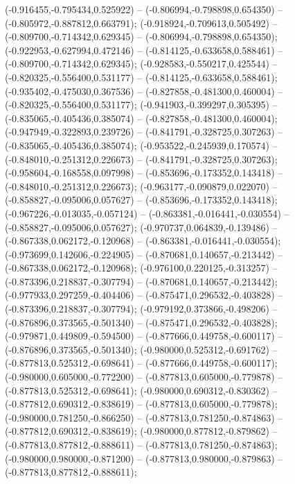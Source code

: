  (-0.916455,-0.795434,0.525922) -- (-0.806994,-0.798898,0.654350) -- (-0.805972,-0.887812,0.663791);
 (-0.918924,-0.709613,0.505492) -- (-0.809700,-0.714342,0.629345) -- (-0.806994,-0.798898,0.654350);
 (-0.922953,-0.627994,0.472146) -- (-0.814125,-0.633658,0.588461) -- (-0.809700,-0.714342,0.629345);
 (-0.928583,-0.550217,0.425544) -- (-0.820325,-0.556400,0.531177) -- (-0.814125,-0.633658,0.588461);
 (-0.935402,-0.475030,0.367536) -- (-0.827858,-0.481300,0.460004) -- (-0.820325,-0.556400,0.531177);
 (-0.941903,-0.399297,0.305395) -- (-0.835065,-0.405436,0.385074) -- (-0.827858,-0.481300,0.460004);
 (-0.947949,-0.322893,0.239726) -- (-0.841791,-0.328725,0.307263) -- (-0.835065,-0.405436,0.385074);
 (-0.953522,-0.245939,0.170574) -- (-0.848010,-0.251312,0.226673) -- (-0.841791,-0.328725,0.307263);
 (-0.958604,-0.168558,0.097998) -- (-0.853696,-0.173352,0.143418) -- (-0.848010,-0.251312,0.226673);
 (-0.963177,-0.090879,0.022070) -- (-0.858827,-0.095006,0.057627) -- (-0.853696,-0.173352,0.143418);
 (-0.967226,-0.013035,-0.057124) -- (-0.863381,-0.016441,-0.030554) -- (-0.858827,-0.095006,0.057627);
 (-0.970737,0.064839,-0.139486) -- (-0.867338,0.062172,-0.120968) -- (-0.863381,-0.016441,-0.030554);
 (-0.973699,0.142606,-0.224905) -- (-0.870681,0.140657,-0.213442) -- (-0.867338,0.062172,-0.120968);
 (-0.976100,0.220125,-0.313257) -- (-0.873396,0.218837,-0.307794) -- (-0.870681,0.140657,-0.213442);
 (-0.977933,0.297259,-0.404406) -- (-0.875471,0.296532,-0.403828) -- (-0.873396,0.218837,-0.307794);
 (-0.979192,0.373866,-0.498206) -- (-0.876896,0.373565,-0.501340) -- (-0.875471,0.296532,-0.403828);
 (-0.979871,0.449809,-0.594500) -- (-0.877666,0.449758,-0.600117) -- (-0.876896,0.373565,-0.501340);
 (-0.980000,0.525312,-0.691762) -- (-0.877813,0.525312,-0.698641) -- (-0.877666,0.449758,-0.600117);
 (-0.980000,0.605000,-0.772200) -- (-0.877813,0.605000,-0.779878) -- (-0.877813,0.525312,-0.698641);
 (-0.980000,0.690312,-0.830362) -- (-0.877812,0.690312,-0.838619) -- (-0.877813,0.605000,-0.779878);
 (-0.980000,0.781250,-0.866250) -- (-0.877813,0.781250,-0.874863) -- (-0.877812,0.690312,-0.838619);
 (-0.980000,0.877812,-0.879862) -- (-0.877813,0.877812,-0.888611) -- (-0.877813,0.781250,-0.874863);
 (-0.980000,0.980000,-0.871200) -- (-0.877813,0.980000,-0.879863) -- (-0.877813,0.877812,-0.888611);
